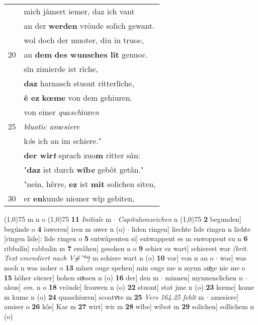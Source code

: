 \documentclass[8pt,a4paper,notitlepage]{article}
\begin{document}
\begin{table}[ht]
\begin{minipage}[t]{0.5\linewidth}
\begin{tabular}{rl}
 & mich jâmert iemer, daz ich vant\\ 
 & an der \textbf{werden} vröude solich gewant.\\ 
 & wol doch der muoter, diu in truoc,\\ 
20 & an \textbf{dem} \textbf{des wunsches lît} genuoc.\\ 
 & sîn zimierde ist rîche,\\ 
 & \textbf{daz} harnasch stuont ritterlîche,\\ 
 & \textbf{ê ez} \textbf{kœme} von dem gehiuren.\\ 
 & von einer \textit{qu}a\textit{sch}iure\textit{n}\\ 
25 & \textit{bluotic am}e\textit{siere}\\ 
 & k\textit{ô}s ich an im schiere."\\ 
 & \textbf{der wir\textit{t}} sprach zuo\textbf{m} ritter sân:\\ 
 & "\textbf{daz} ist durch \textbf{wîb\textit{e}} gebôt getân."\\ 
 & "nein, hêrre, \textbf{ez} ist \textbf{mit} solichen siten,\\ 
30 & er \textbf{en}kunde niemer wîp gebiten,\\ 
\end{tabular}
\scriptsize
\line(1,0){75} \newline
m n o \newline
\line(1,0){75} \newline
\textbf{11} \textit{Initiale} m   $\cdot$ \textit{Capitulumzeichen} n  \newline
\line(1,0){75} \newline
\textbf{2} begunden] begúnde o \textbf{4} iuweren] iren m uwer n (o)  $\cdot$ liden ringen] liechte lide ringen n liehte [ringen lide]: lide ringen o \textbf{5} entwâpenten si] entwappent es m enwoppent su n \textbf{6} ribbalîn] rabbalin m \textbf{7} ersâhen] gesohen n o \textbf{9} schier ez wart] schierest war \textit{(krit. Text emendiert nach V#'* ͫ)} m schiere wart n (o) \textbf{10} vor] von n an o  $\cdot$ was] was noch n was noher o \textbf{13} mîner ouge spehen] min ouge me n mynn auͯge nie me o \textbf{15} hôher süezer] hohen suͯssen n (o) \textbf{16} der] den m  $\cdot$ minnen] mynnenclichen n  $\cdot$ alsus] \textit{om.} n o \textbf{18} vröude] frouwen n (o) \textbf{22} stuont] stat jme n (o) \textbf{23} kœme] kome m kume n (o) \textbf{24} quaschiuren] scoatvͯre m \textbf{25} \textit{Vers 164.25 fehlt} m   $\cdot$ amesiere] amiser o \textbf{26} kôs] Kas m \textbf{27} wirt] wir m \textbf{28} wîbe] wibot m \textbf{29} solichen] sollichem n (o) \newline
\end{minipage}
\end{table}
\end{document}
